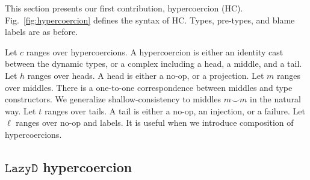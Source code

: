 \documentclass[acmsmall,review,anonymous]{acmart}\settopmatter{printfolios=true,printccs=false,printacmref=false}
\newcommand{\figref}[1]{Fig.~\ref{#1}}
\newcommand{\lazyD}{$\mathtt{Lazy D}$}
\begin{document}

This section presents our first contribution, hypercoercion (HC). 
\figref{fig:hypercoercion} defines the syntax of HC.
Types, pre-types, and blame labels are as before.

Let $ c $ ranges over hypercoercions. A hypercoercion is either 
an identity cast between the dynamic types, or a complex including a head, a 
middle, and a tail. 
Let $ h $ ranges over heads. A head is either a no-op, or a projection.
Let $ m $ ranges over middles. There is a one-to-one 
correspondence between middles and type constructors. 
We generalize shallow-consistency to middles $ m \smile m $ in the natural way.
Let $ t $ ranges over tails. A tail is either a no-op, an injection, or a 
failure. 
Let $ \ell $ ranges over no-op and labels. It is useful when we introduce 
composition of hypercoercions.

\subsection{\lazyD{} hypercoercion}
\end{document}
